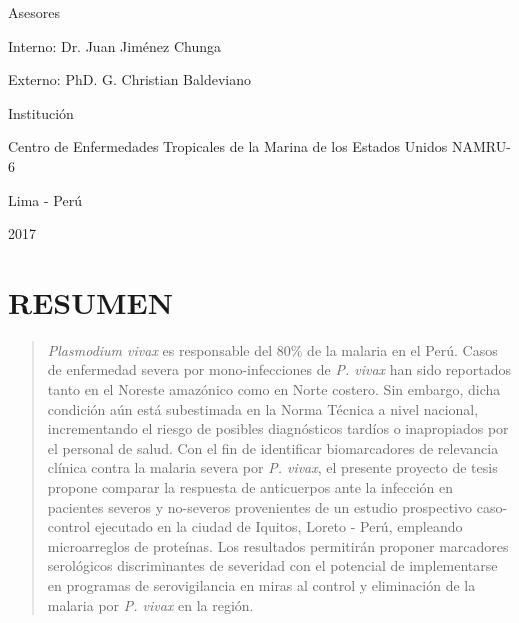 \documentclass[a4paper]{article}
\begin{document}
\begin{centering}
\vspace{.3 cm}

Asesores

Interno: Dr. Juan Jiménez Chunga %

Externo: PhD. G. Christian Baldeviano

\vspace{.3 cm}

Institución

Centro de Enfermedades Tropicales de la Marina de los Estados Unidos 
NAMRU-6



\vspace{1.7 cm}

\Large
Lima - Perú


2017

\end{centering}

\vfill
\restoregeometry
\clearpage

\newpage

\tableofcontents

\newpage


\section*{RESUMEN}\label{resumen}

\begin{quote}
\emph{Plasmodium vivax} es responsable del 80\% de la malaria en el
Perú. Casos de enfermedad severa por mono-infecciones de \emph{P. vivax}
han sido reportados tanto en el Noreste amazónico como en Norte costero.
Sin embargo, dicha condición aún está subestimada en la Norma Técnica a
nivel nacional, incrementando el riesgo de posibles diagnósticos tardíos
o inapropiados por el personal de salud. Con el fin de identificar
biomarcadores de relevancia clínica contra la malaria severa por
\emph{P. vivax}, el presente proyecto de tesis propone comparar la
respuesta de anticuerpos ante la infección en pacientes severos y
no-severos provenientes de un estudio prospectivo caso-control ejecutado
en la ciudad de Iquitos, Loreto - Perú, empleando microarreglos de
proteínas. Los resultados permitirán proponer marcadores serológicos
discriminantes de severidad con el potencial de implementarse en
programas de serovigilancia en miras al control y eliminación de la
malaria por \emph{P. vivax} en la región.
\end{quote}
\end{document}
